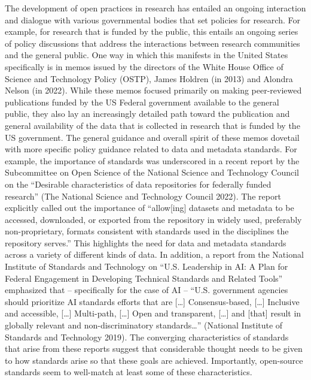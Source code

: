 \documentclass[
  letterpaper,
  DIV=11,
  numbers=noendperiod]{scrartcl}
\begin{document}
The development of open practices in research has entailed an ongoing
interaction and dialogue with various governmental bodies that set
policies for research. For example, for research that is funded by the
public, this entails an ongoing series of policy discussions that
address the interactions between research communities and the general
public. One way in which this manifests in the United States
specifically is in memos issued by the directors of the White House
Office of Science and Technology Policy (OSTP), James Holdren (in 2013)
and Alondra Nelson (in 2022). While these memos focused primarily on
making peer-reviewed publications funded by the US Federal government
available to the general public, they also lay an increasingly detailed
path toward the publication and general availability of the data that is
collected in research that is funded by the US government. The general
guidance and overall spirit of these memos dovetail with more specific
policy guidance related to data and metadata standards. For example, the
importance of standards was underscored in a recent report by the
Subcommittee on Open Science of the National Science and Technology
Council on the ``Desirable characteristics of data repositories for
federally funded research'' (The National Science and Technology Council
2022). The report explicitly called out the importance of
``allow{[}ing{]} datasets and metadata to be accessed, downloaded, or
exported from the repository in widely used, preferably non-proprietary,
formats consistent with standards used in the disciplines the repository
serves.'' This highlights the need for data and metadata standards
across a variety of different kinds of data. In addition, a report from
the National Institute of Standards and Technology on ``U.S. Leadership
in AI: A Plan for Federal Engagement in Developing Technical Standards
and Related Tools'' emphasized that -- specifically for the case of AI
-- ``U.S. government agencies should prioritize AI standards efforts
that are {[}\ldots{]} Consensus-based, {[}\ldots{]} Inclusive and
accessible, {[}\ldots{]} Multi-path, {[}\ldots{]} Open and transparent,
{[}\ldots{]} and {[}that{]} result in globally relevant and
non-discriminatory standards\ldots{}'' (National Institute of Standards
and Technology 2019). The converging characteristics of standards that
arise from these reports suggest that considerable thought needs to be
given to how standards arise so that these goals are achieved.
Importantly, open-source standards seem to well-match at least some of
these characteristics.
\end{document}
